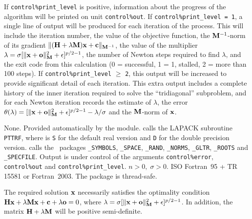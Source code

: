 \documentclass{galahad}
\newcommand{\packagename}{GL\-RT}
\begin{document}

\galinfo
If {\tt control\%print\_level} is positive, information about the progress
of the algorithm will be printed on unit {\tt control\-\%\-out}.
If {\tt control\%print\_level = 1}, a single line of output will be produced
for each iteration of the process. This will include
the iteration number, the value of the objective function, the
${\mathbf{M}}^{-1}$-norm of its gradient
$\| ( {\mathbf{H}} + \lambda {\mathbf{M}} ) {\mathbf{x}} + {\mathbf{c}} \|_{{\mathbf{M}}^{-1}}$,
the value of the multiplier $\lambda =
\sigma [ \|{\mathbf{x}}+{\mathbf{o}}\|_{{\mathbf{M}}}^2 + \epsilon ]^{p/2-1}$,
the number of Newton steps required to find $\lambda$, and the exit
code from this calculation (0 = successful, 1 = 1, stalled, 2 = more than
100 steps).
If {\tt control\%print\_level} $\geq$ {\tt 2}, this
output will be increased to provide significant detail of each iteration.
This extra output includes a complete history of the inner iteration required
to solve the ``tridiagonal'' subproblem, and for each Newton iteration records
the estimate of $\lambda$, the error
$\theta(\lambda) = [ \|{\mathbf{x}}+{\mathbf{o}}\|_{{\mathbf{M}}}^2 + \epsilon ]^{p/2-1}
- \lambda / \sigma$ and the ${\mathbf{M}}$-norm of ${\mathbf{x}}$.


\galgeneral

\galcommon None.
\galworkspace Provided automatically by the module.
\galroutines {\tt \packagename\_solve} calls the LAPACK subroutine
{\tt *PTTRF}, where {\tt *} is {\tt S} for
the default real version and {\tt D} for the double precision version.
\galmodules {\tt \packagename\_solve} calls the \galahad\ packages
{\tt \libraryname\_SY\-M\-BOLS},
{\tt \libraryname\_SPACE},
{\tt \libraryname\_RAND},
{\tt \libraryname\_\-NORMS},
{\tt \libraryname\_\-GLTR},
{\tt \libraryname\_\-ROOTS} and
{\tt \libraryname\_SPECFILE}.
\galio Output is under control of the arguments
{\tt control\%error}, {\tt control\%out} and {\tt control\%print\_level}.
\galrestrictions $n  >  0, \;  \sigma  >  0$.
\galportability ISO Fortran~95 + TR 15581 or Fortran~2003.
The package is thread-safe.


\galmethod
The required solution ${\mathbf{x}}$ necessarily satisfies the optimality condition
${\mathbf{H}} {\mathbf{x}} + \lambda {\mathbf{M}} {\mathbf{x}} + {\mathbf{c}} + \lambda {\mathbf{o}} = 0$, where
$\lambda = \sigma [ \|{\mathbf{x}}+{\mathbf{o}}\|_{{\mathbf{M}}}^2 + \epsilon ]^{p/2-1}$.
In addition, the matrix ${\mathbf{H}} + \lambda {\mathbf{M}}$ will be positive semi-definite.
\end{document}
